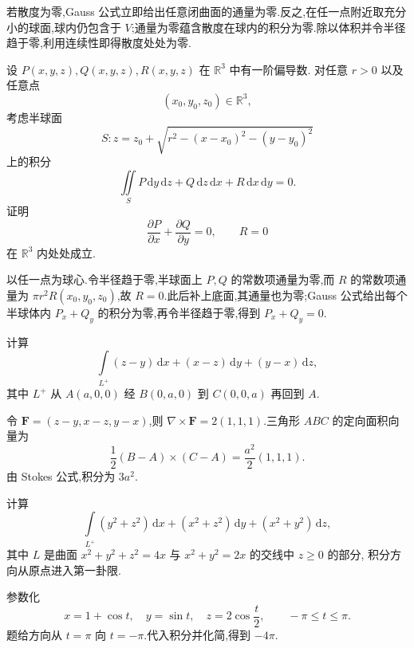 \begin{solution}
    若散度为零,Gauss 公式立即给出任意闭曲面的通量为零.反之,在任一点附近取充分小的球面,球内仍包含于 $V$;通量为零蕴含散度在球内的积分为零.除以体积并令半径趋于零,利用连续性即得散度处处为零.
\end{solution}

\begin{example}
    设 $P(x,y,z),Q(x,y,z),R(x,y,z)$ 在 $\mathbb{R}^3$ 中有一阶偏导数. 对任意 $r>0$ 以及任意点
    \[
        (x_0,y_0,z_0)\in\mathbb{R}^3,
    \]
    考虑半球面
    \[
        S:z=z_0+\sqrt{r^2-(x-x_0)^2-(y-y_0)^2}
    \]
    上的积分
    \[
        \iint\limits_S
        P\,\mathrm{d}y\,\mathrm{d}z
        +Q\,\mathrm{d}z\,\mathrm{d}x
        +R\,\mathrm{d}x\,\mathrm{d}y=0.
    \]
    证明
    \[
        \dfrac{\partial P}{\partial x}+\dfrac{\partial Q}{\partial y}=0,
        \qquad R=0
    \]
    在 $\mathbb{R}^3$ 内处处成立.
\end{example}
\exampleblank

\begin{solution}
    以任一点为球心.令半径趋于零,半球面上 $P,Q$ 的常数项通量为零,而 $R$ 的常数项通量为 $\pi r^2R(x_0,y_0,z_0)$,故 $R=0$.此后补上底面,其通量也为零;Gauss 公式给出每个半球体内 $P_x+Q_y$ 的积分为零,再令半径趋于零,得到 $P_x+Q_y=0$.
\end{solution}

\begin{example}
    计算
    \[
        \int\limits_{L^+}(z-y)\,\mathrm{d}x+(x-z)\,\mathrm{d}y+(y-x)\,\mathrm{d}z,
    \]
    其中 $L^+$ 从 $A(a,0,0)$ 经 $B(0,a,0)$ 到 $C(0,0,a)$ 再回到 $A$.
\end{example}
\exampleblank

\begin{solution}
    令 $\bm F=(z-y,x-z,y-x)$,则 $\nabla\times\bm F=2(1,1,1)$.三角形 $ABC$ 的定向面积向量为
    \[
        \dfrac{1}{2}(B-A)\times(C-A)=\dfrac{a^2}{2}(1,1,1).
    \]
    由 Stokes 公式,积分为 $3a^2$.
\end{solution}

\begin{example}
    计算
    \[
        \int\limits_{L^+}(y^2+z^2)\,\mathrm{d}x+(x^2+z^2)\,\mathrm{d}y+(x^2+y^2)\,\mathrm{d}z,
    \]
    其中 $L$ 是曲面 $x^2+y^2+z^2=4x$ 与 $x^2+y^2=2x$ 的交线中 $z\geq0$ 的部分, 积分方向从原点进入第一卦限.
\end{example}
\exampleblank

\begin{solution}
    参数化
    \[
        x=1+\cos t,\quad y=\sin t,\quad z=2\cos\dfrac{t}{2},\qquad -\pi\leq t\leq\pi.
    \]
    题给方向从 $t=\pi$ 向 $t=-\pi$.代入积分并化简,得到 $-4\pi$.
\end{solution}

